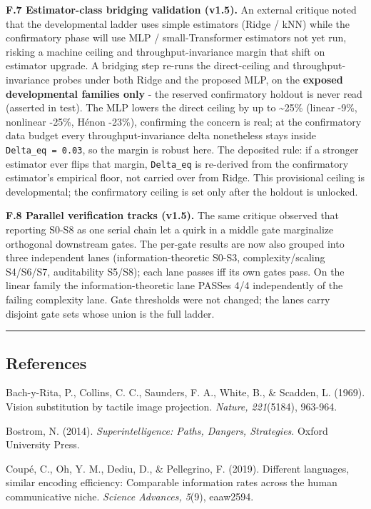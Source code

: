 \documentclass[
  11pt,
]{article}
\newcounter{none} %
\begin{document}
\textbf{F.7 Estimator-class bridging validation
(v1.5).} An external critique noted that the
developmental ladder uses simple estimators
(Ridge / kNN) while the confirmatory phase will
use MLP / small-Transformer estimators not yet
run, risking a machine ceiling and
throughput-invariance margin that shift on
estimator upgrade. A bridging step re-runs the
direct-ceiling and throughput-invariance probes
under both Ridge and the proposed MLP, on the
\textbf{exposed developmental families only} -
the reserved confirmatory holdout is never read
(asserted in test). The MLP lowers the direct
ceiling by up to \textasciitilde25\% (linear
-9\%, nonlinear -25\%, Hénon -23\%), confirming
the concern is real; at the confirmatory data
budget every throughput-invariance delta
nonetheless stays inside
\texttt{Delta\_eq\ =\ 0.03}, so the margin is
robust here. The deposited rule: if a stronger
estimator ever flips that margin,
\texttt{Delta\_eq} is re-derived from the
confirmatory estimator's empirical floor, not
carried over from Ridge. This provisional
ceiling is developmental; the confirmatory
ceiling is set only after the holdout is
unlocked.

\textbf{F.8 Parallel verification tracks
(v1.5).} The same critique observed that
reporting S0-S8 as one serial chain let a quirk
in a middle gate marginalize orthogonal
downstream gates. The per-gate results are now
also grouped into three independent lanes
(information-theoretic S0-S3, complexity/scaling
S4/S6/S7, auditability S5/S8); each lane passes
iff its own gates pass. On the linear family the
information-theoretic lane PASSes 4/4
independently of the failing complexity lane.
Gate thresholds were not changed; the lanes
carry disjoint gate sets whose union is the full
ladder.

\begin{center}\rule{0.5\linewidth}{0.5pt}\end{center}

\subsection{References}\label{references}

Bach-y-Rita, P., Collins, C. C., Saunders, F.
A., White, B., \& Scadden, L. (1969). Vision
substitution by tactile image projection.
\emph{Nature, 221}(5184), 963-964.

Bostrom, N. (2014). \emph{Superintelligence:
Paths, Dangers, Strategies}. Oxford University
Press.

Coupé, C., Oh, Y. M., Dediu, D., \& Pellegrino,
F. (2019). Different languages, similar encoding
efficiency: Comparable information rates across
the human communicative niche. \emph{Science
Advances, 5}(9), eaaw2594.
\end{document}
